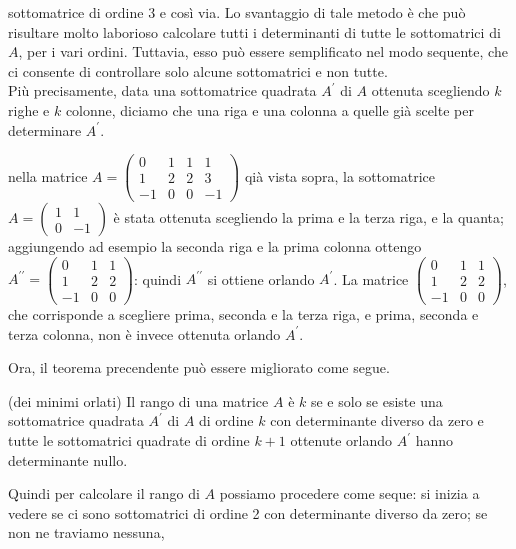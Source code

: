 sottomatrice di ordine 3 e così via. Lo svantaggio di tale metodo è che può risultare molto laborioso calcolare
tutti i determinanti di tutte le sottomatrici di $A$, per i vari ordini. Tuttavia, esso può essere semplificato
nel modo sequente, che ci consente di controllare solo alcune sottomatrici e non tutte.\\
Più precisamente, data una sottomatrice quadrata $A^\prime$ di $A$ ottenuta scegliendo $k$ righe e $k$ colonne,
diciamo che una riga e una colonna a quelle già scelte per determinare $A^\prime$.
\begin{esempio}
  nella matrice $A=
  \begin{pmatrix}
    0 & 1 & 1 & 1 \\
    1 & 2 & 2 & 3 \\
    -1 & 0 & 0 & -1
  \end{pmatrix}
  $ qià vista sopra, la sottomatrice $A=
  \begin{pmatrix}
    1 & 1 \\
    0 & -1
  \end{pmatrix}
  $ è stata ottenuta scegliendo la prima e  la terza riga, e la quanta; aggiungendo ad esempio la seconda riga e
  la prima colonna ottengo $A^{\prime\prime}=
  \begin{pmatrix}
    0 &1 &1\\
    1 & 2& 2\\
    -1 & 0 & 0
  \end{pmatrix}
  $: quindi $A^{\prime\prime}$ si ottiene orlando $A^\prime$. La matrice $
  \begin{pmatrix}
    0 &1&1\\
    1&2&2\\
    -1&0&0
  \end{pmatrix}
  $, che corrisponde a scegliere prima, seconda e la terza riga, e prima, seconda e terza colonna, non è invece
  ottenuta orlando $A^\prime$.
\end{esempio}
Ora, il teorema precendente può essere migliorato come segue.
\begin{teorema}
  (dei minimi orlati) Il rango di una matrice $A$ è $k$ se e solo se esiste una sottomatrice
  quadrata $A^\prime$ di $A$ di ordine $k$ con determinante diverso da zero e tutte le
  sottomatrici quadrate di ordine $k+1$ ottenute orlando $A^\prime$ hanno determinante nullo.
\end{teorema}
Quindi per calcolare il rango di $A$ possiamo procedere come seque: si inizia a vedere se ci sono
sottomatrici di ordine 2 con determinante diverso da zero; se non ne traviamo nessuna,
